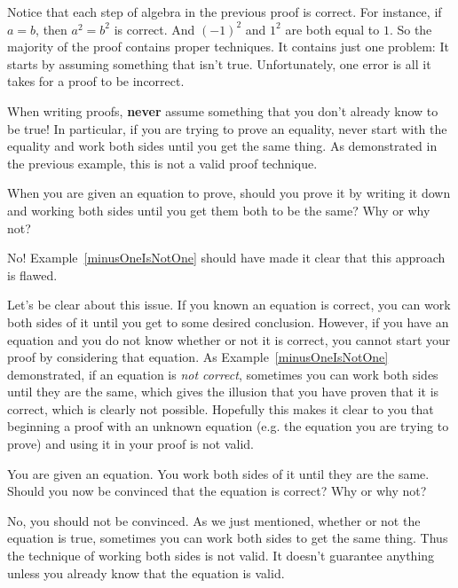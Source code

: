 Notice that each step of algebra in the previous proof is correct.  For instance, if $a=b$, then $a^2=b^2$
is correct.
And $(-1)^2$ and $1^2$ are both equal to $1$.  So the majority of the proof contains proper techniques.
It contains just one problem: It starts by assuming something that isn't true.
Unfortunately, one error is all it takes for a proof to be incorrect.

\begin{rem}
When writing proofs, {\bf never} assume something that you don't already know to be true!
In particular, if you are trying to prove an equality, never start with the equality and work both sides 
until you get the same thing. As demonstrated in the previous example, this is not a valid proof technique.
\end{rem}

\newpage

\begin{ques}
When you are given an equation to prove, 
should you prove it by writing it down and working both sides
until you get them both to be the same?  Why or why not?\\
\answerlinetwo
\begin{answer}
No!  Example~\ref{minusOneIsNotOne} should have made it clear that this approach is flawed.
\end{answer}
\end{ques}

Let's be clear about this issue.  
If you known an equation is correct, you can work both sides of it until you get to some desired conclusion.
However, if you have an equation and you do not know whether or not it is correct, 
you cannot start your proof by considering that equation.
As Example~\ref{minusOneIsNotOne} demonstrated, if an equation is {\em not correct}, 
sometimes you can work both sides until they are the same, which gives the illusion that you
have proven that it is correct, which is clearly not possible. Hopefully this makes it clear to 
you that beginning a proof with an unknown equation (e.g. the equation you are trying to prove)
and using it in your proof is not valid. 

\begin{ques}
You are given an equation.  You work both sides of it until they are the same.  
Should you now be convinced that the equation is correct? Why or why not?\\
\answerlinetwo
\begin{answer}
No, you should not be convinced.  
As we just mentioned, whether or not the equation is true, sometimes you can work both
sides to get the same thing.  Thus the technique of working both sides is not valid.  
It doesn't guarantee anything unless you already know that the equation is valid.
\end{answer}
\end{ques}

